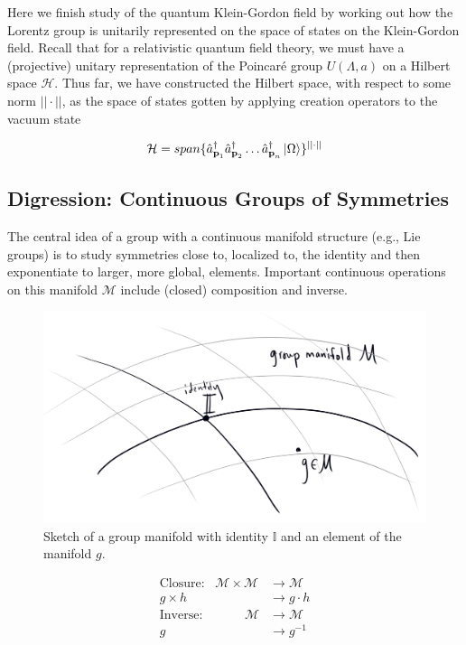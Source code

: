 \noindent Here we finish study of the quantum Klein-Gordon field by working out how the Lorentz group is unitarily represented on the space of states on the Klein-Gordon field. Recall that for a relativistic quantum field theory, we must have a (projective) unitary representation of the Poincar\'e group $U(\Lambda, a)$ on a Hilbert space $\mathcal{H}$. Thus far, we have constructed the Hilbert space, with respect to some norm $|| \cdot ||$, as the space of states gotten by applying creation operators to the vacuum state

\begin{equation}
\mathcal{H} = span \{ \hat{a}_{\textbf{p}_1}^\dagger \hat{a}_{\textbf{p}_2}^\dagger \dots \hat{a}_{\textbf{p}_n}^\dagger \ket{\Omega} \} ^{||\cdot||}
\end{equation}

\subsection*{Digression: Continuous Groups of Symmetries}

\noindent The central idea of a group with a continuous manifold structure (e.g., Lie groups) is to study symmetries close to, localized to, the identity and then exponentiate to larger, more global, elements. Important continuous operations on this manifold $\mathcal{M}$ include (closed) composition and inverse. \\

\begin{figure}[H]
	\centering
	\includegraphics[scale=0.3]{groupmanifold.png}
	\caption{Sketch of a group manifold with identity $\mathbb{I}$ and an element of the manifold $g$.}
\end{figure}

\begin{align}
\text{Closure:} \,\,\,\,\, \mathcal{M} \times \mathcal{M} &\rightarrow \mathcal{M} \\
g \times h &\rightarrow g \cdot h \\
\text{Inverse:} \,\,\,\,\,\,\,\,\,\,\,\,\,\,\,\,\,\,\,\, \mathcal{M} &\rightarrow \mathcal{M} \\
g &\rightarrow g^{-1}
\end{align}

